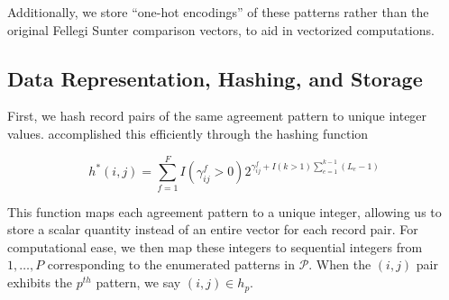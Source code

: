 \documentclass[12pt,letterpaper]{article}
\newcommand{\1}[1]{\mathbb{I}\!\left[#1\right]} %
\begin{document}
Additionally, we store ``one-hot encodings'' of these patterns rather than the original Fellegi Sunter comparison vectors, to aid in vectorized computations.  


\hypertarget{data-representation-hashing-and-storage}{%
	\subsection{Data Representation, Hashing, and
		Storage}\label{data-representation-hashing-and-storage}}

First, we hash record pairs of the same agreement pattern to unique integer values. \citep{enamorado2019using} accomplished this efficiently through the hashing function

$$h^{*}(i, j) = \sum_{f = 1}^F I(\gamma_{ij}^f > 0)2^{\gamma_{ij}^f + I(k>1)\sum_{e=1}^{k-1}(L_e -1)}$$

This function maps each agreement pattern to a unique integer, allowing us to store a scalar quantity instead of an entire vector for each record pair. For computational ease, we then map these integers to sequential integers from $1, \ldots, P$ corresponding to the enumerated patterns in $\mathcal{P}$. When the $(i, j)$ pair exhibits the $p^{th}$ pattern, we say $(i, j) \in h_p$.
\end{document}
